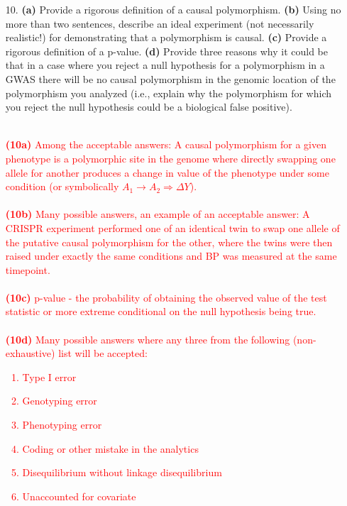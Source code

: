 \documentclass[letterpaper, 11pt]{article}
\begin{document}
\begin{itemize}
\item[10.] \textbf{(a)} Provide a rigorous definition of a causal polymorphism.  \textbf{(b)} Using no more than two sentences, describe an ideal experiment (not necessarily realistic!) for demonstrating that a polymorphism is causal. \textbf{(c)} Provide a rigorous definition of a p-value.  \textbf{(d)} Provide three reasons why it could be that in a case where you reject a null hypothesis for a polymorphism in a GWAS there will be no causal polymorphism in the genomic location of the polymorphism you analyzed (i.e., explain why the polymorphism for which you reject the null hypothesis could be a biological false positive).
\\
\\
\textcolor{red}{ 
\textbf{(10a)} Among the acceptable answers: A causal polymorphism for a given phenotype is a polymorphic site in the genome where directly swapping one allele for another produces a change in value of the phenotype under some condition (or symbolically $A_1 \rightarrow A_2 \Rightarrow \Delta Y$).
\\
\\
\textbf{(10b)} Many possible answers, an example of an acceptable answer: A CRISPR experiment performed one of an identical twin to swap one allele of the putative causal polymorphism for the other, where the twins were then raised under exactly the same conditions and BP was measured at the same timepoint.
\\
\\
\textbf{(10c)} p-value - the probability of obtaining the observed value of the test statistic or more extreme conditional on the null hypothesis being true.
\\
\\
\textbf{(10d)} Many possible answers where any three from the following (non-exhaustive) list will be accepted:
\begin{enumerate}
\item Type I error 
\item Genotyping error
\item Phenotyping error
\item Coding or other mistake in the analytics
\item Disequilibrium without linkage disequilibrium
\item Unaccounted for covariate
\end{enumerate}
} 


\end{itemize}
\end{document}
